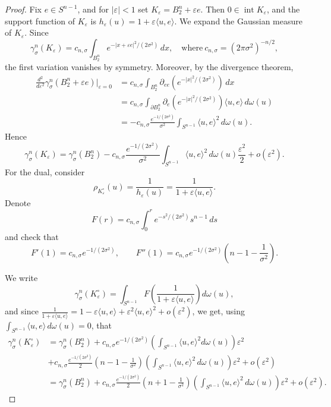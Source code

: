 \documentclass[10pt,a4paper]{amsart}
\newcommand{\eps}{\varepsilon}
\begin{document}
\begin{proof}
Fix \(e\in S^{n-1}\), and for \(|\eps|<1\) set
$K_\eps=B_2^n+\eps e$. 
Then \(0\in \operatorname{int}K_\eps\), and the support function of
\(K_\eps\) is $h_\eps(u)=1+\eps\langle u,e\rangle$. 
We expand the Gaussian measure of \(K_\eps\). Since
\[
        \gamma_\sigma^n(K_\eps)
        =
        c_{n,\sigma} \int_{B_2^n}
        e^{-|x+\eps e|^2/(2\sigma^2)}\,dx ,\quad \text{where} \ c_{n,\sigma}=(2\pi\sigma^2)^{-n/2},
\]
the first variation vanishes by symmetry. Moreover, by the divergence theorem, 
\[
\begin{aligned}
        \frac{d^2}{d\eps^2}
        \gamma_\sigma^n(B_2^n+\eps e)\bigg|_{\eps=0}
        &=
        c_{n,\sigma} \int_{B_2^n}\partial_{ee}
        \left(
        e^{-|x|^2/(2\sigma^2)}\right)\,dx  \\
        &=
        c_{n,\sigma}\int_{\partial B_2^n}
        \partial_e
        \left(
        e^{-|x|^2/(2\sigma^2)}\right)
        \langle u,e\rangle\,d\omega(u)  \\
        &=
        -c_{n,\sigma}\frac{e^{-1/(2\sigma^2)}}{\sigma^2}
        \int_{  S^{n-1}}\langle u,e\rangle^2\,d\omega(u).
\end{aligned}
\]
Hence
\[
        \gamma_\sigma^n(K_\eps)
        =
        \gamma_\sigma^n(B_2^n)
        -
        c_{n,\sigma}\frac{e^{-1/(2\sigma^2)}}{\sigma^2}
        \int_{  S^{n-1}}\langle u,e\rangle^2\,d\omega(u)\frac{\eps^2}{2}
        +
        o(\eps^2).
\]
For the dual, consider 
\[
        \rho_{K_\eps^\circ}(u)=\frac1{h_\eps(u)}
        =
        \frac1{1+\eps\langle u,e\rangle}.
\]
Denote
\[
        F(r)
        =
        c_{n,\sigma}
        \int_0^r e^{-s^2/(2\sigma^2)}s^{n-1}\,ds  
\]
and check that 
\[
        F'(1)=c_{n,\sigma}e^{-1/(2\sigma^2)},
        \qquad
        F''(1)=c_{n,\sigma}e^{-1/(2\sigma^2)}\left(n-1-\frac1{\sigma^2}\right). 
\]

We write 
\[
        \gamma_\sigma^n(K_\eps^\circ)
        =
        \int_{ S^{n-1}}
        F\left(\frac1{1+\eps\langle u,e\rangle}\right)
        d\omega(u),\]
and since  $\frac1{1+\eps\langle u,e\rangle}
        =
        1-\eps\langle u,e\rangle
        +\eps^2\langle u,e\rangle^2
        +
        o(\eps^2)$, we get, using
\(\int_{S^{n-1}}\langle u,e\rangle\,d\omega(u)=0\), that
\[
\begin{aligned}
        \gamma_\sigma^n(K_\eps^\circ)
        &=
        \gamma_\sigma^n(B_2^n)
        +
        c_{n,\sigma}e^{-1/(2\sigma^2)} \left(\int_{  S^{n-1}}\langle u,e\rangle^2 d\omega(u)\right)\eps^2
        \\&+
      c_{n,\sigma}\frac{e^{-1/(2\sigma^2)}}{2} 
        \left(n-1-\frac1{\sigma^2}\right)\left(\int_{  S^{n-1}}\langle u,e\rangle^2\,d\omega(u)\right)\eps^2
        +
        o(\eps^2)  \\
        &=
        \gamma_\sigma^n(B_2^n)
        +
        c_{n,\sigma}\frac{e^{-1/(2\sigma^2)}}{2}
        \left(n+1-\frac1{\sigma^2}\right)\left(\int_{ S^{n-1}}\langle u,e\rangle^2\,d\omega(u)\right)\eps^2
        +
        o(\eps^2).
\end{aligned}
\]


\end{proof}
\end{document}
